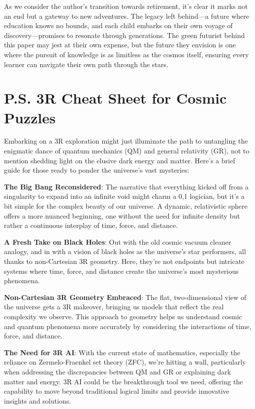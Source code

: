 \documentclass[12pt]{article}
\begin{document}
As we consider the author’s transition towards retirement, it's clear it marks not an end but a gateway to new adventures. The legacy left behind—a future where education knows no bounds, and each child embarks on their own voyage of discovery—promises to resonate through generations. The green futurist behind this paper may jest at their own expense, but the future they envision is one where the pursuit of knowledge is as limitless as the cosmos itself, ensuring every learner can navigate their own path through the stars.

\section*{P.S. 3R Cheat Sheet for Cosmic Puzzles}

Embarking on a 3R exploration might just illuminate the path to untangling the enigmatic dance of quantum mechanics (QM) and general relativity (GR), not to mention shedding light on the elusive dark energy and matter. Here's a brief guide for those ready to ponder the universe's vast mysteries:

\textbf{The Big Bang Reconsidered}: The narrative that everything kicked off from a singularity to expand into an infinite void might charm a {0,1} logician, but it's a bit simple for the complex beauty of our universe. A dynamic, relativistic sphere offers a more nuanced beginning, one without the need for infinite density but rather a continuous interplay of time, force, and distance.

\textbf{A Fresh Take on Black Holes}: Out with the old cosmic vacuum cleaner analogy, and in with a vision of black holes as the universe's star performers, all thanks to non-Cartesian 3R geometry. Here, they're not endpoints but intricate systems where time, force, and distance create the universe's most mysterious phenomena.

\textbf{Non-Cartesian 3R Geometry Embraced}: The flat, two-dimensional view of the universe gets a 3R makeover, bringing us models that reflect the real complexity we observe. This approach to geometry helps us understand cosmic and quantum phenomena more accurately by considering the interactions of time, force, and distance.

\textbf{The Need for 3R AI}: With the current state of mathematics, especially the reliance on Zermelo-Fraenkel set theory (ZFC), we're hitting a wall, particularly when addressing the discrepancies between QM and GR or explaining dark matter and energy. 3R AI could be the breakthrough tool we need, offering the capability to move beyond traditional logical limits and provide innovative insights and solutions.
\end{document}
